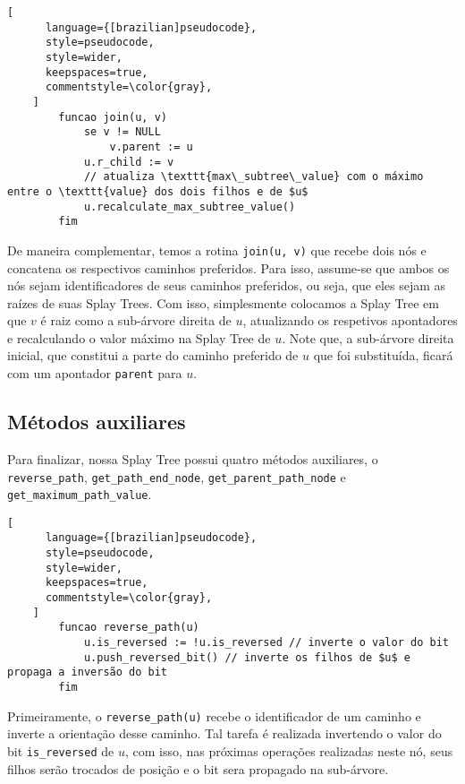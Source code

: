\begin{programruledcaption}{\label{splay:join}}
    \begin{lstlisting}[
      language={[brazilian]pseudocode},
      style=pseudocode,
      style=wider,
      keepspaces=true,
      commentstyle=\color{gray},
    ]
        funcao join(u, v)
            se v != NULL
                v.parent := u
            u.r_child := v
            // atualiza \texttt{max\_subtree\_value} com o máximo entre o \texttt{value} dos dois filhos e de $u$ 
            u.recalculate_max_subtree_value() 
        fim
    \end{lstlisting}
\end{programruledcaption}

De maneira complementar, temos a rotina \texttt{join(u, v)} que recebe dois nós e concatena os respectivos caminhos preferidos. Para isso, assume-se que ambos os nós sejam identificadores de seus caminhos preferidos, ou seja, que eles sejam as raízes de suas Splay Trees. Com isso, simplesmente colocamos a Splay Tree em que $v$ é raiz como a sub-árvore direita de $u$, atualizando os respetivos apontadores e recalculando o valor máximo na Splay Tree de $u$. Note que, a sub-árvore direita inicial, que constitui a parte do caminho preferido de $u$ que foi substituída, ficará com um apontador \texttt{parent} para $u$.

\subsection{Métodos auxiliares}
\label{subsection:lct-splay-aux}

Para finalizar, nossa Splay Tree possui quatro métodos auxiliares, o \texttt{reverse\_path}, \texttt{get\_path\_end\_node}, \texttt{get\_parent\_path\_node} e \texttt{get\_maximum\_path\_value}.

\begin{programruledcaption}{\label{splay:reverse-path}}
    \begin{lstlisting}[
      language={[brazilian]pseudocode},
      style=pseudocode,
      style=wider,
      keepspaces=true,
      commentstyle=\color{gray},
    ]
        funcao reverse_path(u)
            u.is_reversed := !u.is_reversed // inverte o valor do bit
            u.push_reversed_bit() // inverte os filhos de $u$ e propaga a inversão do bit
        fim
    \end{lstlisting}
\end{programruledcaption}

Primeiramente, o \texttt{reverse\_path(u)} recebe o identificador de um caminho e inverte a orientação desse caminho. Tal tarefa é realizada invertendo o valor do bit \texttt{is\_reversed} de $u$, com isso, nas próximas operações realizadas neste nó, seus filhos serão trocados de posição e o bit sera propagado na sub-árvore.

